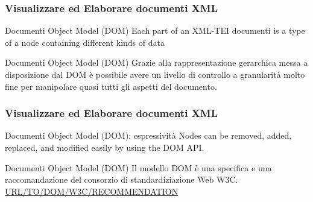 \begin{frame}
    \frametitle{Visualizzare ed Elaborare documenti XML}
    \addtocounter{nframe}{1}
    

     \begin{block}{Documenti Object Model (DOM)}
        Each part of an XML-TEI documenti is a type of a node containing different kinds of data

     \end{block}

     \begin{block}{Documenti Object Model (DOM)}
        Grazie alla rappresentazione gerarchica messa a disposizione dal DOM è possibile avere un livello di controllo a granularità molto fine per manipolare quasi tutti gli aspetti del documento.
     \end{block}
     
\end{frame}

\begin{frame}
    \frametitle{Visualizzare ed Elaborare documenti XML}
    \addtocounter{nframe}{1}
    

     \begin{block}{Documenti Object Model (DOM): espressività}
        Nodes can be removed, added, replaced, and modified easily by using the DOM API.
     \end{block}

     \begin{block}{Documenti Object Model (DOM)}
        Il modello DOM è una specifica e una raccomandazione del consorzio di standardiziazione Web W3C.
        \\\url{URL/TO/DOM/W3C/RECOMMENDATION}
     \end{block}
     
\end{frame}


